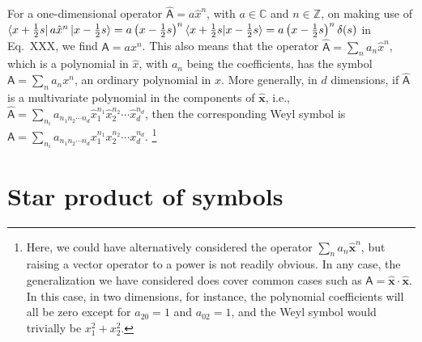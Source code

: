 \begin{example}
  For a one-dimensional operator $\hat{\mathsf{A}} = a\hat{x}^{n}$, with $a \in \mathbb{C}$ and $n \in \mathbb{Z}$, on making use of $\mathinner{\langle{x + \frac{1}{2}s}\rvert}a\hat{x}^{n}\mathinner{\lvert{x - \frac{1}{2}s}\rangle} = a \left(x - \frac{1}{2}s\right)^{n}\mathinner{\langle{x + \frac{1}{2}s | x - \frac{1}{2}s}\rangle} = a\left(x - \frac{1}{2}s\right)^{n} \delta(s)$ in Eq.~XXX, we find $\mathsf{A} = a x^{n}$.
  This also means that the operator $\hat{\mathsf{A}} = \sum_{n} a_{n}\hat{x}^{n}$, which is a polynomial in $\hat{x}$, with $a_{n}$ being the coefficients, has the symbol
  $\mathsf{A} = \sum_{n} a_{n}{x}^{n}$, an ordinary polynomial in $x$.
  More generally, in $d$ dimensions, if $\hat{\mathsf{A}}$ is a multivariate polynomial in the components of $\hat{\bm{x}}$, i.e., $\hat{\mathsf{A}} = \sum_{n_{i}} a_{n_{1}n_{2}\cdots n_{d}} \hat{x}_{1}^{n_{1}}\hat{x}_{2}^{n_{2}}\cdots \hat{x}_{d}^{n_{d}}$, then the corresponding Weyl symbol is $\mathsf{A} = \sum_{n_{i}} a_{n_{1}n_{2}\cdots n_{d}} {x}_{1}^{n_{1}}{x}_{2}^{n_{2}}\cdots {x}_{d}^{n_{d}}$.%
  \footnote{Here, we could have alternatively considered the operator $\sum_{n} a_{n} \hat{\bm{x}}^{n}$, but raising a vector operator to a power is not readily obvious.
    In any case, the generalization we have considered does cover common cases such as $\hat{\mathsf{A}} = \hat{\bm{x}}\cdot\hat{\bm{x}}$.
  In this case, in two dimensions, for instance, the polynomial coefficients will all be zero except for $a_{20} = 1$ and $a_{02} = 1$, and the Weyl symbol would trivially be $x_{1}^{2} + x_{2}^{2}$.}
\end{example}

\section{Star product of symbols}

